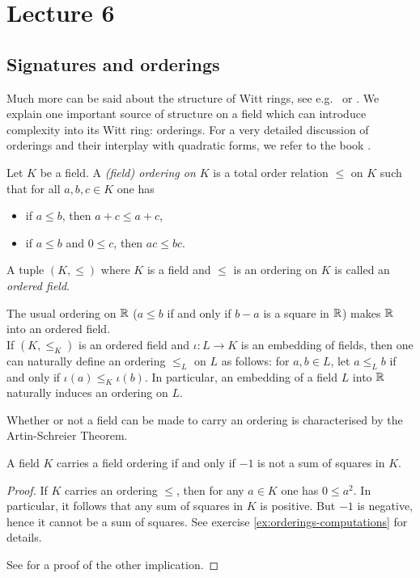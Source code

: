 \documentclass[12pt, leqno, british]{amsart}
\author{Nicolas Daans}
\begin{document}
\section{Lecture 6}

\subsection{Signatures and orderings}
Much more can be said about the structure of Witt rings, see e.g.~\autocite[Chapter V]{ElmanKarpenkoMerkurjev} or \autocite[Sections VIII.7 and VIII.8]{Lam}.
We explain one important source of structure on a field which can introduce complexity into its Witt ring: orderings.
For a very detailed discussion of orderings and their interplay with quadratic forms, we refer to the book \autocite{OrderingsLam}.
\begin{defi}
Let $K$ be a field.
A \emph{(field) ordering on $K$} is a total order relation $\leq$ on $K$ such that for all $a, b, c \in K$ one has
\begin{itemize}
\item if $a \leq b$, then $a + c \leq a + c$,
\item if $a \leq b$ and $0 \leq c$, then $ac \leq bc$.
\end{itemize}
A tuple $(K, \leq)$ where $K$ is a field and $\leq$ is an ordering on $K$ is called an \emph{ordered field}.
\end{defi}
\begin{egs}
The usual ordering on $\mathbb R$ ($a \leq b$ if and only if $b-a$ is a square in $\mathbb R$) makes $\mathbb R$ into an ordered field. \\
If $(K, \leq_K)$ is an ordered field and $\iota : L \to K$ is an embedding of fields, then one can naturally define an ordering $\leq_L$ on $L$ as follows: for $a, b \in L$, let $a \leq_L b$ if and only if $\iota(a) \leq_K \iota(b)$.
In particular, an embedding of a field $L$ into $\mathbb R$ naturally induces an ordering on $L$.
\end{egs}
Whether or not a field can be made to carry an ordering is characterised by the Artin-Schreier Theorem.
\begin{thm}\label{T:Artin-Schreier}
A field $K$ carries a field ordering if and only if $-1$ is not a sum of squares in $K$.
\end{thm}
\begin{proof}
If $K$ carries an ordering $\leq$, then for any $a \in K$ one has $0 \leq a^2$.
In particular, it follows that any sum of squares in $K$ is positive.
But $-1$ is negative, hence it cannot be a sum of squares.
See exercise \eqref{ex:orderings-computations} for details.

See \autocite[]{OrderingsLam} for a proof of the other implication.
\end{proof}
\end{document}
